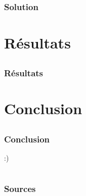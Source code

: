 \documentclass[11pt,compress]{beamer}
\begin{document}
\subsection{}
\begin{frame}
\frametitle{Solution}

\end{frame}

\section{Résultats}
\subsection{}
\begin{frame}
\frametitle{Résultats}

\end{frame}

\section{Conclusion}
\subsection{}
\begin{frame}
\frametitle{Conclusion}
:)
\end{frame}

\section*{}
\begin{frame}
\frametitle{Sources}

\end{frame}
\end{document}
